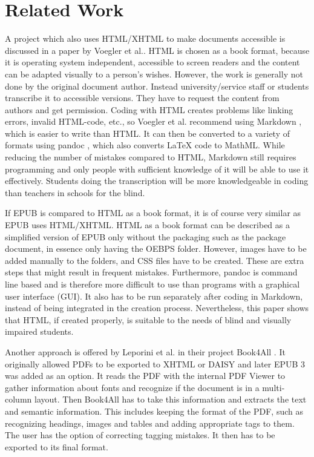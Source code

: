 
\chapter{Related Work}
\label{ch:RelatedWork}

A project which also uses HTML/XHTML to make documents accessible is discussed in a paper \cite{markdownSyntax} by Voegler et al.. HTML is chosen as a book format, because it is operating system independent, accessible to screen readers and the content can be adapted visually to a person's wishes.  However, the work is generally not done by the original document author. Instead university/service staff or students transcribe it to accessible versions. They have to request the content from authors and get permission. 
Coding with HTML creates problems like linking errors, invalid HTML-code, etc., so Voegler et al. recommend using Markdown \cite{Markdown}, which is easier to write than HTML. It can then be converted to a variety of formats using pandoc \cite{Pandoc}, which also converts LaTeX code to MathML.
While reducing the number of mistakes compared to HTML, Markdown still requires programming and only people with sufficient knowledge of it will be able to use it effectively. Students doing the transcription will be more knowledgeable in coding than teachers in schools for the blind. 

If EPUB is compared to HTML as a book format, it is of course very similar as EPUB uses HTML/XHTML. HTML as a book format can be described as a simplified version of EPUB only without the packaging such as the package document, in essence only having the OEBPS folder. However, images have to be added manually to the folders, and CSS files have to be created. These are extra steps that might result in frequent mistakes. Furthermore, pandoc is command line based and is therefore more difficult to use than programs with a graphical user interface (GUI). It also has to be run separately after coding in Markdown, instead of being integrated in the creation process. Nevertheless, this paper shows that HTML, if created properly, is suitable to the needs of blind and visually impaired students.

Another approach is offered by Leporini et al. in their project Book4All \cite{book4all}. It originally allowed PDFs to be exported to XHTML or DAISY and later EPUB 3 was added as an option. It reads the PDF with the internal PDF Viewer to gather information about fonts and recognize if the document is in a multi-column layout. Then Book4All has to take this information and extracts the text and semantic information. This includes keeping the format of the PDF, such as recognizing headings, images and tables and adding appropriate tags to them. The user has the option of correcting tagging mistakes. It then has to be exported to its final format. 

